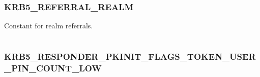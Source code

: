 \documentclass[letterpaper,10pt,english]{sphinxmanual}
\begin{document}
\begin{tabulary}{\linewidth}{|L|L|}
\hline

 & 
\\
\hline\end{tabulary}



\subsubsection{KRB5\_REFERRAL\_REALM}
\label{appdev/refs/macros/KRB5_REFERRAL_REALM:krb5-referral-realm-data}\label{appdev/refs/macros/KRB5_REFERRAL_REALM::doc}\label{appdev/refs/macros/KRB5_REFERRAL_REALM:krb5-referral-realm}

\begin{fulllineitems}
\label{appdev/refs/macros/KRB5_REFERRAL_REALM:KRB5_REFERRAL_REALM}
\end{fulllineitems}


Constant for realm referrals.

\begin{tabulary}{\linewidth}{|L|L|}
\hline

 & 
\\
\hline\end{tabulary}



\subsubsection{KRB5\_RESPONDER\_PKINIT\_FLAGS\_TOKEN\_USER\_PIN\_COUNT\_LOW}
\label{appdev/refs/macros/KRB5_RESPONDER_PKINIT_FLAGS_TOKEN_USER_PIN_COUNT_LOW:krb5-responder-pkinit-flags-token-user-pin-count-low-data}\label{appdev/refs/macros/KRB5_RESPONDER_PKINIT_FLAGS_TOKEN_USER_PIN_COUNT_LOW::doc}\label{appdev/refs/macros/KRB5_RESPONDER_PKINIT_FLAGS_TOKEN_USER_PIN_COUNT_LOW:krb5-responder-pkinit-flags-token-user-pin-count-low}

\begin{fulllineitems}
\label{appdev/refs/macros/KRB5_RESPONDER_PKINIT_FLAGS_TOKEN_USER_PIN_COUNT_LOW:KRB5_RESPONDER_PKINIT_FLAGS_TOKEN_USER_PIN_COUNT_LOW}
\end{fulllineitems}
\end{document}
